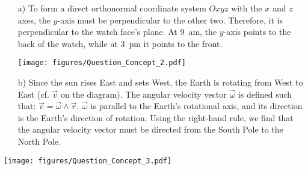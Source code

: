 %
%

\begin{center}
\vspace*{5mm}
\end{center}

\begin{enumerate}
\item[a)] To form a direct orthonormal coordinate system $Oxyz$ with the $x$ and $z$ axes, the $y$-axis must be perpendicular to the other two. Therefore, it is perpendicular to the watch face's plane. At 9~am, the $y$-axis points to the back of the watch, while at 3~pm it points to the front.
\hspace*{0.5cm}
\begin{center}
 \texttt{[image: figures/Question\_Concept\_2.pdf]}
\end{center}
\end{enumerate}
\begin{minipage}{0.6\textwidth}\begin{enumerate}
\item[b)] Since the sun rises East and sets West, the Earth is rotating from West to East (cf. $\vec{v}$ on the diagram). The angular velocity vector $\vec{\omega}$ is defined such that: $\vec{v}=\vec{\omega}\wedge\vec{r}$. $\vec{\omega}$ is parallel to the Earth's rotational axis, and its direction is the Earth's direction of rotation. Using the right-hand rule, we find that the angular velocity vector must be directed from the South Pole to the North Pole.
\end{enumerate}
\end{minipage}
\begin{minipage}{0.4\textwidth}\begin{center}
\texttt{[image: figures/Question\_Concept\_3.pdf]}
\end{center}
\end{minipage}
